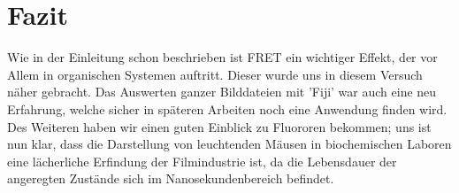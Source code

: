 

\chapter{Fazit}
\label{chap:fazit}
Wie in der Einleitung schon beschrieben ist FRET ein wichtiger Effekt, der vor Allem in organischen Systemen auftritt. Dieser 
wurde uns in diesem Versuch näher gebracht. Das Auswerten ganzer Bilddateien mit 'Fiji' war auch eine neu Erfahrung, 
welche sicher in späteren Arbeiten noch eine Anwendung finden wird. Des Weiteren haben wir einen guten Einblick zu Fluororen bekommen; uns ist nun klar, dass
die Darstellung von leuchtenden Mäusen in biochemischen Laboren eine lächerliche Erfindung der Filmindustrie ist, da die Lebensdauer der angeregten 
Zustände sich im Nanosekundenbereich befindet. 

